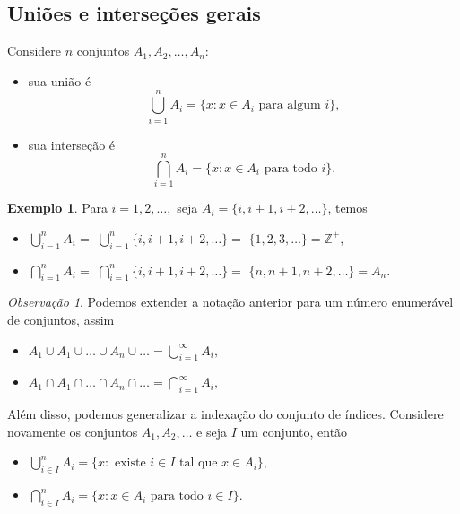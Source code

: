 \documentclass[]{book}
\providecommand{\tightlist}{%
  \setlength{\itemsep}{0pt}\setlength{\parskip}{0pt}}
\theoremstyle{definition}
\theoremstyle{definition}
\newtheorem{example}{Exemplo}[chapter]
\theoremstyle{definition}
\theoremstyle{remark}
\newtheorem*{remark}{Observação}
\begin{document}
\hypertarget{uniuxf5es-e-interseuxe7uxf5es-gerais}{%
\subsection{Uniões e interseções gerais}\label{uniuxf5es-e-interseuxe7uxf5es-gerais}}

Considere \(n\) conjuntos \(A_1, A_2, \ldots, A_n:\)

\begin{itemize}
\tightlist
\item
  sua união é \[\bigcup_{i=1}^{n}A_i = \{x: x \in A_i \text{ para algum $i$}\},\]
\item
  sua interseção é \[\bigcap_{i=1}^{n}A_i = \{x: x \in A_i \text{ para todo $i$}\}.\]
\end{itemize}

\begin{example}
\protect\hypertarget{exm:unnamed-chunk-15}{}{\label{exm:unnamed-chunk-15} }Para \(i=1,2,\ldots,\) seja \(A_i=\{i, i+1, i+2, \ldots\}\), temos

\begin{itemize}
\item
  \(\bigcup_{i=1}^{n}A_i =\) \(\bigcup_{i=1}^{n}\{i, i+1, i+2, \ldots\} =\) \(\{1,2,3,\ldots\}=\mathbb{Z}^+\),
\item
  \(\bigcap_{i=1}^{n}A_i =\) \(\bigcap_{i=1}^{n}\{i, i+1, i+2, \ldots\} =\) \(\{n,n+1,n+2,\ldots\}=A_n\).
\end{itemize}
\end{example}

\begin{remark}
\iffalse{} {Observação. } \fi{}Podemos extender a notação anterior para um número enumerável de conjuntos, assim

\begin{itemize}
\item
  \(A_1 \cup A_1 \cup \ldots \cup A_n \cup \ldots = \bigcup_{i=1}^{\infty}A_i,\)
\item
  \(A_1 \cap A_1 \cap \ldots \cap A_n \cap \ldots = \bigcap_{i=1}^{\infty}A_i,\)
\end{itemize}
\end{remark}

Além disso, podemos generalizar a indexação do conjunto de índices.
Considere novamente os conjuntos \(A_1, A_2, \ldots\) e seja \(I\) um conjunto, então

\begin{itemize}
\tightlist
\item
  \(\bigcup_{i\in I}^{n}A_i = \{x: \text{ existe } i\in I \text{ tal que } x \in A_i\},\)
\item
  \(\bigcap_{i\in I}^{n}A_i = \{x: x \in A_i \text{ para todo $i \in I$}\}.\)
\end{itemize}
\end{document}
